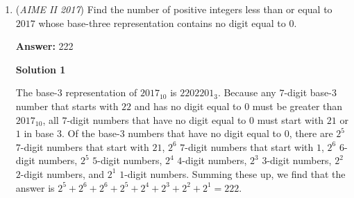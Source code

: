 \begin{enumerate}
 Therefore the probability is $\frac{\frac{109}{5}}{60}=\frac{109}{300}$. Thus giving the final answer of $109+300=\boxed{409}$.

 Solution by phoenixfire

 



\textbf{Solution 5}

Draw the circumradii from the circumcenter to the three vertices. Drop perpendicular from the circumcenter to the sides. Note that since the triangle is isosceles, the perpendicular are in fact perpendicular bisectors. Therefore the region containing the points closer to B are in $\triangle{OBP_{1}} , \triangle{OBP_{2}}$ where $O$ is the circumcenter and $P_{1}, P_{2}$ points of contact of the perpendiculars and the sides. Therefore our fraction is $\frac{109}{300}$. Our answer is then $\boxed{409}$.

 



\textbf{Solution 6}

Using the same graph and methods as Solution 1, find the coordinates of $P$, $X$, $B$, and $Z$. Also, note that angles $PXB$ and $PZB$ are right angles, so $PXBZ$ is a cyclic quadrilateral. Then, use Brahmagupta's formula to determine the area of the quadrilateral, which is $\frac{109}{5}$. Then find the area of triangle $ABC$, which is $60$. The probability is $\frac{109}{300}$. Finally, we get our answer of $\boxed{409}$



	\item (\textit{AIME II 2017}) Find the number of positive integers less than or equal to $2017$ whose base-three representation contains no digit equal to $0$.


 
 \textbf{Answer: }222



\textbf{Solution 1}

The base-$3$ representation of $2017_{10}$ is $2202201_3$. Because any $7$-digit base-$3$ number that starts with $22$ and has no digit equal to $0$ must be greater than $2017_{10}$, all $7$-digit numbers that have no digit equal to $0$ must start with $21$ or $1$ in base $3$. Of the base-$3$ numbers that have no digit equal to $0$, there are $2^5$ $7$-digit numbers that start with $21$, $2^6$ $7$-digit numbers that start with $1$, $2^6$ $6$-digit numbers, $2^5$ $5$-digit numbers, $2^4$ $4$-digit numbers, $2^3$ $3$-digit numbers, $2^2$ $2$-digit numbers, and $2^1$ $1$-digit numbers. Summing these up, we find that the answer is $2^5+2^6+2^6+2^5+2^4+2^3+2^2+2^1=\boxed{222}$.


\end{enumerate}
